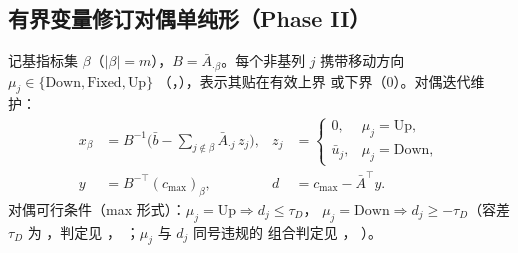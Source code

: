 \documentclass[11pt]{ctexart}
\begin{document}
\subsection{有界变量修订对偶单纯形（Phase II）}
\label{sec:dualmath}
记基指标集 $\beta$（$|\beta|=m$），$B = \bar A_{\cdot\beta}$。每个非基列
$j$ 携带移动方向 $\mu_j\in\{\text{Down},\text{Fixed},\text{Up}\}$
（，），表示其贴在有效上界
或下界（$0$）。对偶迭代维护：
\begin{align}
x_\beta &= B^{-1}\Big(\bar b - \sum_{j\notin\beta} \bar A_{\cdot j}\, z_j\Big),
& z_j &=
\begin{cases}0, & \mu_j=\text{Up},\\ \bar u_j, & \mu_j=\text{Down},\end{cases}
\label{eq:primal}\\
y &= B^{-\top} (c_{\max})_\beta,
& d &= c_{\max} - \bar A^{\top} y .
\label{eq:dual}
\end{align}
对偶可行条件（max 形式）：$\mu_j=\text{Up}\Rightarrow d_j\le \tau_D$，
$\mu_j=\text{Down}\Rightarrow d_j\ge -\tau_D$（容差 $\tau_D$ 为
，判定见 ，
；$\mu_j$ 与 $d_j$ 同号违规的
组合判定见 ，
）。
\end{document}

